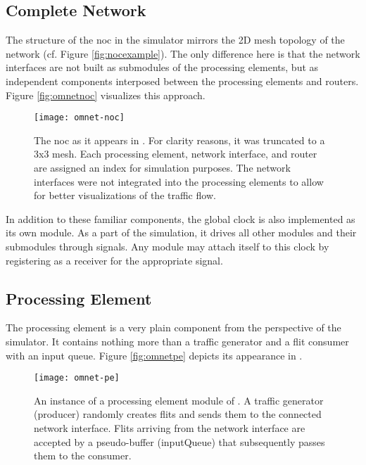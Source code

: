 \subsection{Complete Network}
The structure of the \gls{noc} in the simulator mirrors the 2D mesh topology of the network (cf. Figure \ref{fig:nocexample}). The only difference
here is that the network interfaces are not built as submodules of the processing elements, but as independent components interposed between the
processing elements and routers. Figure \vref{fig:omnetnoc} visualizes this approach.

\begin{figure}
    \centering
    \texttt{[image: omnet-noc]}
    \caption[Simulator view of the NoC]{The \gls{noc} as it appears in \omnet{}. For clarity reasons, it was truncated to a 3x3 mesh. Each processing
    element, network interface, and router are assigned an index for simulation purposes. The network interfaces were not integrated into the
    processing elements to allow for better visualizations of the traffic flow.}
    \label{fig:omnetnoc}
\end{figure}

In addition to these familiar components, the global clock is also implemented as its own module. As a part of the simulation, it drives all other
modules and their submodules through signals. Any module may attach itself to this clock by registering as a receiver for the appropriate signal.

\subsection{Processing Element}
The processing element is a very plain component from the perspective of the simulator. It contains nothing more than a traffic generator and a flit
consumer with an input queue. Figure \vref{fig:omnetpe} depicts its appearance in \omnet{}.

\begin{figure}
    \centering
    \texttt{[image: omnet-pe]}
    \caption[Simulator view of the processing element]{An instance of a processing element module of \omnet{}. A traffic generator (producer) randomly
    creates flits and sends them to the connected network interface. Flits arriving from the network interface are accepted by a pseudo-buffer
    (inputQueue) that subsequently passes them to the consumer.}
    \label{fig:omnetpe}
\end{figure}

